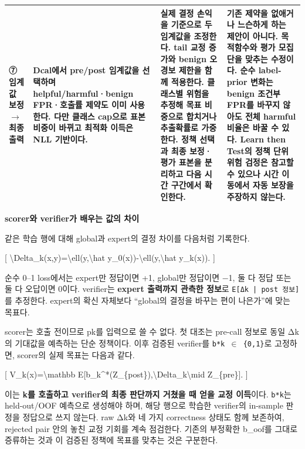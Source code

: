 \begin{longtable}
{}⑦ 임계값 보정  \ensuremath{\rightarrow}  최종 출력 & Dcal에서 pre/\allowbreak{}post 임계값을 선택하며 helpful/\allowbreak{}harmful·benign FPR·호출률 제약도 이미 사용한다. 다만 클래스 cap으로 표본 비중이 바뀌고 최적화 이득은 NLL 기반이다. & 실제 결정 손익을 기준으로 두 임계값을 조정한다. \textbf{tail 교정 증가와 benign 오경보 제한을 함께 적용한다.} 클래스별 위험을 추정해 목표 비중으로 합치거나 추출확률로 가중한다. 정책 선택과 최종 보정·평가 표본을 분리하고 다음 시간 구간에서 확인한다. & 기존 제약을 없애거나 느슨하게 하는 제안이 아니다. 목적함수와 평가 모집단을 맞추는 수정이다. 순수 label-prior 변화는 benign 조건부 FPR를 바꾸지 않아도 전체 harmful 비율은 바꿀 수 있다. Learn then Test의 정책 단위 위험 검정은 참고할 수 있으나 시간 이동에서 자동 보장을 주장하지 않는다. \\
\bottomrule
\end{longtable}
\endgroup
\textbf{scorer와 verifier가 배우는 값의 차이}

같은 학습 행에 대해 global과 expert의 결정 차이를 다음처럼 기록한다.

[ \textbackslash{}Delta\_\allowbreak{}k(x,y)=\allowbreak{}\textbackslash{}ell(y,\textbackslash{}hat y\_\allowbreak{}0(x))-\textbackslash{}ell(y,\textbackslash{}hat y\_\allowbreak{}k(x)). ]

순수 0–1 loss에서는 expert만 정답이면 +\allowbreak{}1, global만 정답이면 −1, 둘 다 정답 또는 둘 다 오답이면 0이다. verifier는 \textbf{expert 출력까지 관측한 정보}로 \texttt{E[Δk | p\allowbreak{}ost 정보]}를 추정한다. expert의 확신 자체보다 “global의 결정을 바꾸는 편이 나은가”에 맞는 목표다.

scorer는 호출 전이므로 pk를 입력으로 쓸 수 없다. 첫 대조는 pre-call 정보로 동일 Δk의 기대값을 예측하는 단순 정책이다. 이후 검증된 verifier를 \texttt{b*k \ensuremath{\in} \{\allowbreak{}0\allowbreak{},\allowbreak{}1\}\allowbreak{}}로 고정하면, scorer의 실제 목표는 다음과 같다.

[ V\_\allowbreak{}k(x)=\allowbreak{}\textbackslash{}mathbb E[b\_\allowbreak{}k\textasciicircum{}*(Z\_\allowbreak{}\{post\}),\textbackslash{}Delta\_\allowbreak{}k\textbackslash{}mid Z\_\allowbreak{}\{pre\}]. ]

이는 \textbf{k를 호출하고 verifier의 최종 판단까지 거쳤을 때 얻을 교정 이득}이다. \texttt{b*k}는 held-out/\allowbreak{}OOF 예측으로 생성해야 하며, 해당 행으로 학습한 verifier의 in-sample 판정을 정답으로 쓰지 않는다. raw Δk와 네 가지 correctness 상태도 함께 보존하여, rejected pair 안의 놓친 교정 기회를 계속 점검한다. 기존의 부정확한 b\_\allowbreak{}oof를 그대로 증류하는 것과 이 검증된 정책에 목표를 맞추는 것은 구분한다.

